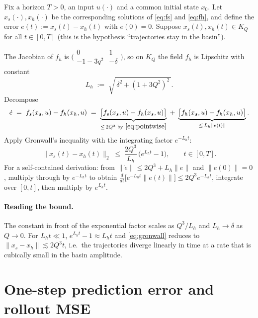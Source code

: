 \documentclass[11pt]{article}
\begin{document}
Fix a horizon \(T > 0\), an input \(u(\cdot)\) and a common initial
state \(x_0\). Let \(x_s(\cdot), x_h(\cdot)\) be the corresponding
solutions of \eqref{eq:fs} and \eqref{eq:fh}, and define the error
\(e(t) := x_s(t) - x_h(t)\) with \(e(0) = 0\). Suppose
\(x_s(t), x_h(t) \in K_Q\) for all \(t \in [0,T]\) (this is the
hypothesis ``trajectories stay in the basin'').

The Jacobian of \(f_h\) is
\(
\bigl(\begin{smallmatrix}
0 & 1 \\ -1 - 3 q^{2} & -\delta
\end{smallmatrix}\bigr)
\),
so on \(K_Q\) the field \(f_h\) is Lipschitz with constant
\begin{equation}
L_h \;:=\; \sqrt{\,\delta^{2} + (1 + 3 Q^{2})^{2}\,}.
\label{eq:Lh}
\end{equation}
Decompose
\begin{equation*}
\dot e
\;=\; f_s(x_s,u) - f_h(x_h,u)
\;=\; \underbrace{\bigl[f_s(x_s,u) - f_h(x_s,u)\bigr]}_{\le\, 2 Q^{3}\;\text{by}~\eqref{eq:pointwise}}
   \;+\; \underbrace{\bigl[f_h(x_s,u) - f_h(x_h,u)\bigr]}_{\le\, L_h \|e(t)\|}.
\end{equation*}
Apply Gronwall's inequality with the integrating factor
\(e^{-L_h t}\):
\begin{equation}
\boxed{\;
\| x_s(t) - x_h(t) \|_2
\;\le\;
\frac{2 Q^{3}}{L_h}\,\bigl(e^{L_h t} - 1\bigr),
\qquad t \in [0, T].
\;}
\label{eq:gronwall}
\end{equation}
For a self-contained derivation: from
\(\|\dot e\| \le 2 Q^3 + L_h \|e\|\) and \(\|e(0)\|=0\),
multiply through by \(e^{-L_h t}\) to obtain
\(\frac{d}{dt} \bigl[ e^{-L_h t} \|e(t)\| \bigr] \le 2 Q^3 e^{-L_h t}\),
integrate over \([0,t]\), then multiply by \(e^{L_h t}\).

\paragraph{Reading the bound.}
The constant in front of the exponential factor scales as
\(Q^{3}/L_h\) and \(L_h \to \delta\) as \(Q \to 0\). For
\(L_h t \ll 1\), \(e^{L_h t} - 1 \approx L_h t\) and
\eqref{eq:gronwall} reduces to
\(\|x_s - x_h\| \lesssim 2 Q^{3} t\), i.e.\ the trajectories
diverge linearly in time at a rate that is cubically small in
the basin amplitude.

\section{One-step prediction error and rollout MSE}
\end{document}
